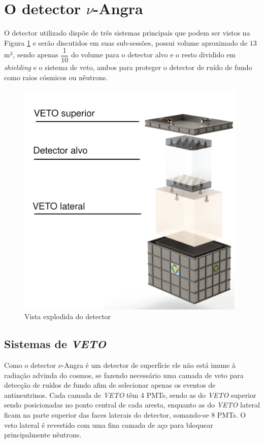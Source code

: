 \section{O detector $\nu$-Angra} \label{sec:detector}

O detector utilizado dispõe de três sistemas principais que podem ser vistos na Figura \ref{fig:detector} e serão discutidos em suas sub-sessões, possui volume aproximado de $13$ m$^3$, sendo apenas $\dfrac{1}{10}$ do volume para o detector alvo e o resto dividido em \emph{shielding} e o sistema de veto, ambos para proteger o detector de ruído de fundo como raios cósmicos ou nêutrons.

\begin{figure}[H]
    \centering
    \includegraphics[width=11cm]{textuais/experimento/figuras/detector.png}
    \caption{Vista explodida do detector}
    \label{fig:detector}
\end{figure}

\subsection{Sistemas de \emph{VETO}}

Como o detector $\nu$-Angra é um detector de superfície ele não está imune à radiação advinda do cosmos, se fazendo necessário uma camada de veto para detecção de ruídos de fundo afim de selecionar apenas os eventos de antineutrinos. Cada camada de \emph{VETO} têm 4 PMTs, sendo as do \emph{VETO} superior sendo posicionadas no ponto central de cada aresta, enquanto as do \emph{VETO} lateral ficam na parte superior das faces laterais do detector, somando-se 8 PMTs. O veto lateral é revestido com uma fina camada de aço para bloquear principalmente nêutrons.\cite{dion2019}

